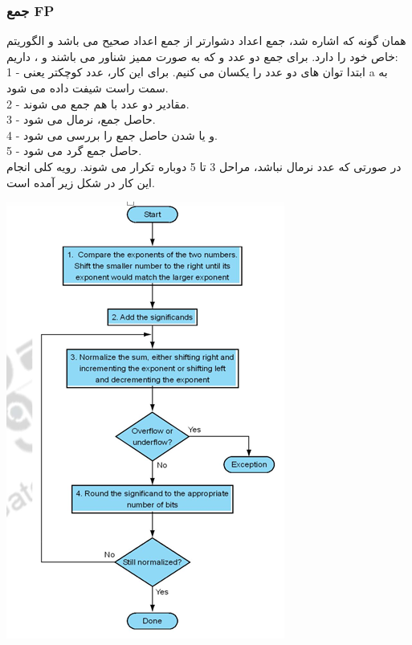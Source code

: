 \documentclass[12pt,titlepage,a4page , tikz , multi,table , svgnames,xcdraw]{article}
\begin{document}
\subsubsection{جمع FP}
	همان گونه که اشاره شد، جمع اعداد 
     دشوارتر از جمع اعداد صحیح می باشد و الگوریتم خاص خود را دارد. برای جمع دو عدد 
     و  
     که به صورت ممیز شناور می باشند و 
    ، داریم: \\
	1 - ابتدا توان های دو عدد را یکسان می کنیم. برای این کار، عدد کوچکتر یعنی a به سمت راست شیفت داده می شود. \\
	2 - مقادیر  دو عدد با هم جمع می شوند. \\
	3 - حاصل جمع، نرمال می شود. \\
	4 - 
     و یا 
     شدن حاصل جمع را بررسی می شود. \\
	5 - حاصل جمع گرد می شود.\\ 
	در صورتی که عدد نرمال نباشد، مراحل 3 تا 5 دوباره تکرار می شوند.
	رویه کلی انجام این کار در شکل زیر آمده است.

\begin{center}
\includegraphics[scale=0.8]
    {Images/Introduction/Floating_point_sum.png}\\
\end{center}
\end{document}
